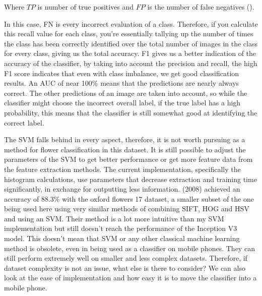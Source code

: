 \documentclass{article}
\begin{document}
Where \(TP\) is number of true positives and \(FP\) is the number of false negatives (\cite{googledevrecall}).

\par

In this case, FN is every incorrect evaluation of a class. Therefore, if you calculate this recall value for each class,
you're essentially tallying up the number of times the class has been correctly identified over the total number of 
images in the class for every class, giving us the total accuracy. F1 gives us a better indication of the accuracy of 
the classifier, by taking into account the precision and recall, the high F1 score indicates that even with class 
imbalance, we get good classification results. An AUC of near 100\% means that the predictions are nearly always 
correct. The other predictions of an image are taken into account, so while the classifier might choose the incorrect 
overall label, if the true label has a high probability, this means that the classifier is still somewhat good at 
identifying the correct label.

\par

The SVM falls behind in every aspect, therefore, it is not worth pursuing as a method for flower classification in this 
dataset. It is still possible to adjust the parameters of the SVM to get better performance or get more feature data 
from the feature extraction methods. The current implementation, specifically the histogram calculations, use parameters
that decrease extraction and training time significantly, in exchange for outputting less information. 
\citeauthor{Nilsback2008} (2008) 
achieved an accuracy of 88.3\% with the oxford flowers 17 dataset, a smaller subset of the one being used here using 
very similar methods of combining SIFT, HOG and HSV and using an SVM. Their method is a lot more intuitive than my SVM 
implementation but still doesn't reach the performance of the Inception V3 model. This doesn't mean that SVM or any 
other classical machine learning method is obsolete, even in being used as a classifier on mobile phones. They can still
perform extremely well on smaller and less complex datasets. Therefore, if dataset complexity is not an issue, what 
else is there to consider? We can also look at the ease of implementation and how easy it is to move the classifier 
into a mobile phone.
\end{document}
